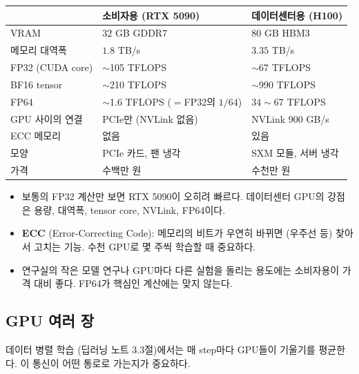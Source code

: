 \documentclass[11pt,a4paper]{article}
\begin{document}
\begin{center}
{\small
\begin{tabular}{@{}lll@{}}
\toprule
& 소비자용 (RTX 5090) & 데이터센터용 (H100) \\
\midrule
VRAM & $32$ GB GDDR7 & $80$ GB HBM3 \\
메모리 대역폭 & $1.8$ TB/s & $3.35$ TB/s \\
FP32 (CUDA core) & $\sim$105 TFLOPS & $\sim$67 TFLOPS \\
BF16 tensor & $\sim$210 TFLOPS & $\sim$990 TFLOPS \\
FP64 & $\sim$1.6 TFLOPS ($=$FP32의 $1/64$) & $34\sim67$ TFLOPS \\
GPU 사이의 연결 & PCIe만 (NVLink 없음) & NVLink $900$ GB/s \\
ECC 메모리 & 없음 & 있음 \\
모양 & PCIe 카드, 팬 냉각 & SXM 모듈, 서버 냉각 \\
가격 & 수백만 원 & 수천만 원 \\
\bottomrule
\end{tabular}}
\end{center}

\begin{itemize}[leftmargin=1.5em]
\item 보통의 FP32 계산만 보면 RTX 5090이 오히려 빠르다. 데이터센터 GPU의 강점은 용량, 대역폭, tensor core, NVLink, FP64이다.
\item \textbf{ECC} (Error-Correcting Code): 메모리의 비트가 우연히 바뀌면 (우주선 등) 찾아서 고치는 기능. 수천 GPU로 몇 주씩 학습할 때 중요하다.
\item 연구실의 작은 모델 연구나 GPU마다 다른 실험을 돌리는 용도에는 소비자용이 가격 대비 좋다. FP64가 핵심인 계산에는 맞지 않는다.
\end{itemize}

\subsection{GPU 여러 장}\label{sec:multigpu}

데이터 병렬 학습 (딥러닝 노트 3.3절)에서는 매 step마다 GPU들이 기울기를 평균한다. 이 통신이 어떤 통로로 가는지가 중요하다.
\end{document}
